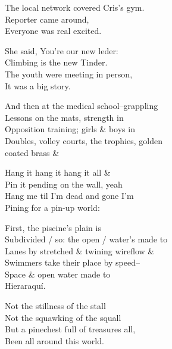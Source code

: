 The local network covered Cris's gym. \\
Reporter came around,  \\
Everyone was real excited. 

She said, You're our new leder:  \\
Climbing is the new Tinder. \\
The youth were meeting in person, \\
It was a big story. 

And then at the medical school--grappling \\
Lessons on the mats, strength in \\
Opposition training; girls \& boys in \\
Doubles, volley courts, the trophies, golden \\
coated brass \&

\qquad Hang it hang it hang it all \& \\
\qquad Pin it pending on the wall, yeah \\
\qquad Hang me til I'm dead and gone I'm \\
\qquad Pining for a pin-up world:

First, the piscine's plain is \\
Subdivided / so: the open / water's made to \\
Lanes by stretched \& twining wireflow \& \\
Swimmers take their place by speed-- \\
Space \& open water made to \\
Hieraraquí.

\qquad Not the stillness of the stall \\
\qquad Not the squawking of the squall \\
\qquad But a pinechest full of treasures all, \\
\qquad Been all around this world. \\
